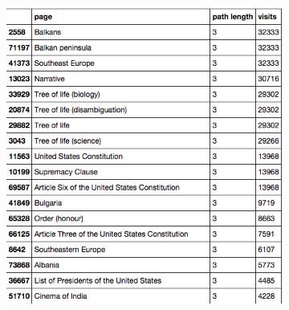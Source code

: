 \documentclass[twoside]{article}
\begin{document}
\begin{figure}[H]
\centering
\caption{highest ranking 2-Cycles}
    \begin{subfigure}[b]{0.8\textwidth}
        \includegraphics[width=\textwidth]{graphics/top_3loops.png}
    \end{subfigure}
\end{figure}
\end{document}
